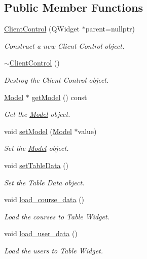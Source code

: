\subsection*{Public Member Functions}
\begin{DoxyCompactItemize}
\item 
\hyperlink{classClientControl_a2324d7192355735436aea9bfc7f84a5b}{Client\+Control} (Q\+Widget $\ast$parent=nullptr)
\begin{DoxyCompactList}\small\item\em Construct a new Client Control object. \end{DoxyCompactList}\item 
\hyperlink{classClientControl_aaa2a3d2e93433ddc9256d34911d9b9bd}{$\sim$\+Client\+Control} ()
\begin{DoxyCompactList}\small\item\em Destroy the Client Control object. \end{DoxyCompactList}\item 
\hyperlink{classModel}{Model} $\ast$ \hyperlink{classClientControl_aefc43486831b9e545a678abae5c592ca}{get\+Model} () const
\begin{DoxyCompactList}\small\item\em Get the \hyperlink{classModel}{Model} object. \end{DoxyCompactList}\item 
void \hyperlink{classClientControl_a3713d76eb6439b0764809e49bc7662ee}{set\+Model} (\hyperlink{classModel}{Model} $\ast$value)
\begin{DoxyCompactList}\small\item\em Set the \hyperlink{classModel}{Model} object. \end{DoxyCompactList}\item 
void \hyperlink{classClientControl_aa3d376fbe49768251c1bf674a10c9944}{set\+Table\+Data} ()
\begin{DoxyCompactList}\small\item\em Set the Table Data object. \end{DoxyCompactList}\item 
void \hyperlink{classClientControl_ab599f87b2be620b137cdfc4eaa060e58}{load\+\_\+course\+\_\+data} ()
\begin{DoxyCompactList}\small\item\em Load the courses to Table Widget. \end{DoxyCompactList}\item 
void \hyperlink{classClientControl_a826a7dc819e15623625da76b4c66f396}{load\+\_\+user\+\_\+data} ()
\begin{DoxyCompactList}\small\item\em Load the users to Table Widget. \end{DoxyCompactList}\end{DoxyCompactItemize}
